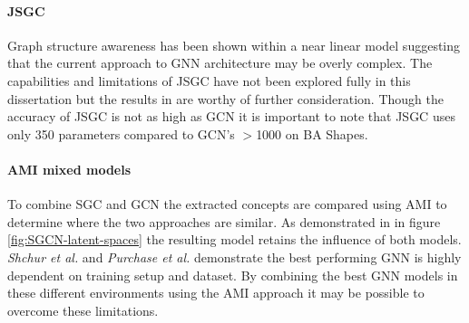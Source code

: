 \paragraph{JSGC}
Graph structure awareness has been shown within a near linear model suggesting that the current approach to GNN architecture may be overly complex.
The capabilities and limitations of JSGC have not been explored fully in this dissertation but the results in  are worthy of further consideration.
Though the accuracy of JSGC is not as high as GCN it is important to note that JSGC uses only 350 parameters compared to GCN's $>$1000 on BA Shapes.

\paragraph{AMI mixed models}
To combine SGC and GCN the extracted concepts are compared using AMI to determine where the two approaches are similar.
As demonstrated in  in figure \ref{fig:SGCN-latent-spaces} the resulting model retains the influence of both models.
\textit{Shchur et al.}\cite{shchur2018pitfalls} and \textit{Purchase et al.}\cite{purchase2022revisiting} demonstrate the best performing GNN is highly dependent on training setup and dataset.
By combining the best GNN models in these different environments using the AMI approach it may be possible to overcome these limitations.
